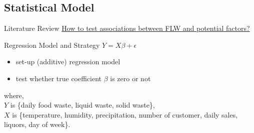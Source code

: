 \documentclass{beamer}\usepackage[]{graphicx}\usepackage[]{xcolor}
\begin{document}
\subsection{Statistical Model}
\begin{frame}{Literature Review}
    \underline{How to test associations between FLW and potential factors?}
    \begin{block}{Regression Model and Strategy}
        \centering$Y = X\beta + \epsilon$\\
        \begin{itemize}
            \item set-up (additive) regression model
            \item test whether true coefficient $\beta$ is zero or not
        \end{itemize}
    \end{block}
    where,\\
        $Y$ is \{daily food waste, liquid waste, solid waste\},\\
        $X$ is \{temperature, humidity, precipitation, number of customer, daily sales, liquors, day of week\}.

\end{frame}
\end{document}

